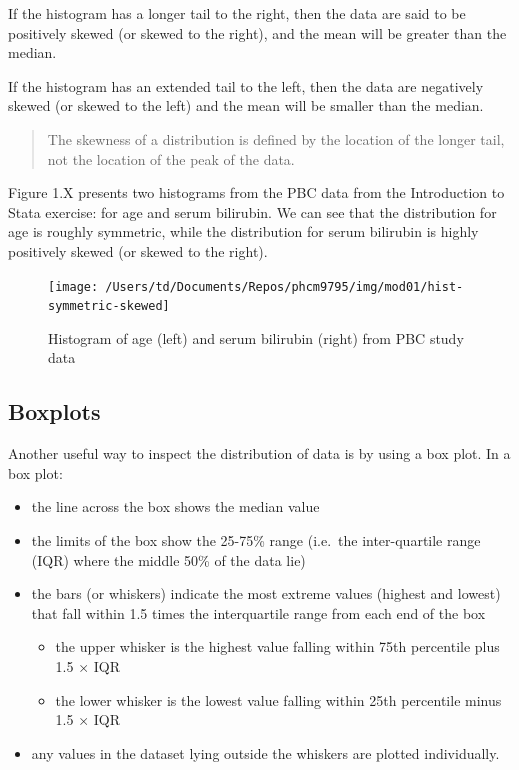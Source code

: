 \documentclass[
]{memoir}
\providecommand{\tightlist}{%
  \setlength{\itemsep}{0pt}\setlength{\parskip}{0pt}}
\begin{document}
If the histogram has a longer tail to the right, then the data are said to be positively skewed (or skewed to the right), and the mean will be greater than the median.

If the histogram has an extended tail to the left, then the data are negatively skewed (or skewed to the left) and the mean will be smaller than the median.

\begin{quote}
The skewness of a distribution is defined by the location of the longer tail, not the location of the peak of the data.
\end{quote}

Figure 1.X presents two histograms from the PBC data from the Introduction to Stata exercise: for age and serum bilirubin. We can see that the distribution for age is roughly symmetric, while the distribution for serum bilirubin is highly positively skewed (or skewed to the right).

\begin{figure}
\texttt{[image: /Users/td/Documents/Repos/phcm9795/img/mod01/hist-symmetric-skewed]} \caption{Histogram of age (left) and serum bilirubin (right) from PBC study data}\label{fig:fig-1-6}
\end{figure}

\hypertarget{boxplots}{%
\subsection{Boxplots}\label{boxplots}}

Another useful way to inspect the distribution of data is by using a box plot. In a box plot:

\begin{itemize}
\tightlist
\item
  the line across the box shows the median value
\item
  the limits of the box show the 25-75\% range (i.e.~the inter-quartile range (IQR) where the middle 50\% of the data lie)
\item
  the bars (or whiskers) indicate the most extreme values (highest and lowest) that fall within 1.5 times the interquartile range from each end of the box

  \begin{itemize}
  \tightlist
  \item
    the upper whisker is the highest value falling within 75th percentile plus 1.5 × IQR
  \item
    the lower whisker is the lowest value falling within 25th percentile minus 1.5 × IQR
  \end{itemize}
\item
  any values in the dataset lying outside the whiskers are plotted individually.
\end{itemize}
\end{document}
